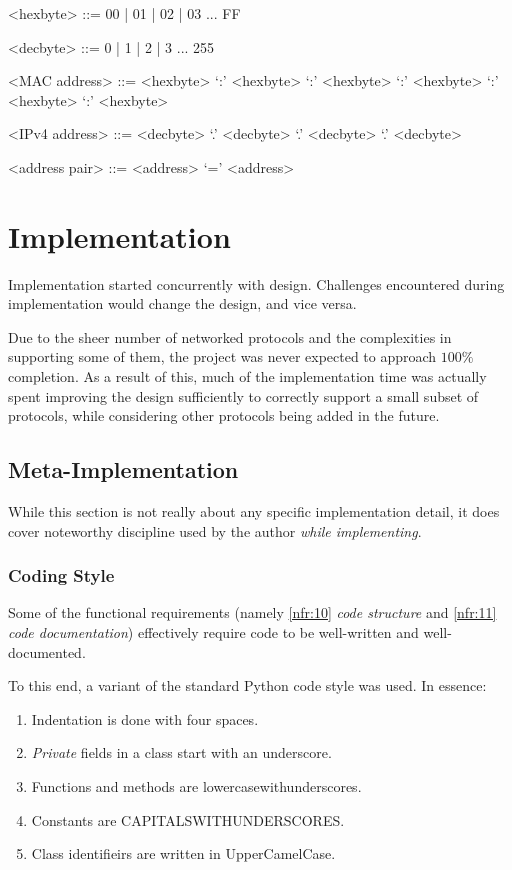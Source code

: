 \documentclass[10pt,a4paper,notitlepage]{report}
\begin{document}
\begin{grammar}
<hexbyte> ::= 00 | 01 | 02 | 03 ... FF

<decbyte> ::= 0 | 1 | 2 | 3 ... 255

<MAC address> ::= <hexbyte> `:' <hexbyte> `:' <hexbyte> `:' <hexbyte> `:' <hexbyte> `:' <hexbyte>

<IPv4 address> ::= <decbyte> `.' <decbyte> `.' <decbyte> `.' <decbyte>

<address pair> ::= <address> `=' <address>
\end{grammar}

\chapter{Implementation}
Implementation started concurrently with design. Challenges encountered during implementation would change the design, and vice versa.

Due to the sheer number of networked protocols and the complexities in supporting some of them, the project was never expected to approach $100\%$ completion. As a result of this, much of the implementation time was actually spent improving the design sufficiently to correctly support a small subset of protocols, while considering other protocols being added in the future.

\section{Meta-Implementation}
While this section is not really about any specific implementation detail, it does cover noteworthy discipline used by the author \emph{while implementing}.

\subsection{Coding Style}
Some of the functional requirements (namely \ref{nfr:10} \emph{code structure} and \ref{nfr:11} \emph{code documentation}) effectively require code to be well-written and well-documented.

To this end, a variant of the standard Python code style was used. In essence:
\begin{enumerate}[label=\roman*)]
\item Indentation is done with four spaces.\\
\item \emph{Private} fields in a class start with an underscore.\\
\item Functions and methods are lower\textunderscore{}case\textunderscore{}with\textunderscore{}underscores.\\
\item Constants are CAPITALS\textunderscore{}WITH\textunderscore{}UNDERSCORES.\\
\item Class identifieirs are written in UpperCamelCase.
\end{enumerate}
\end{document}
